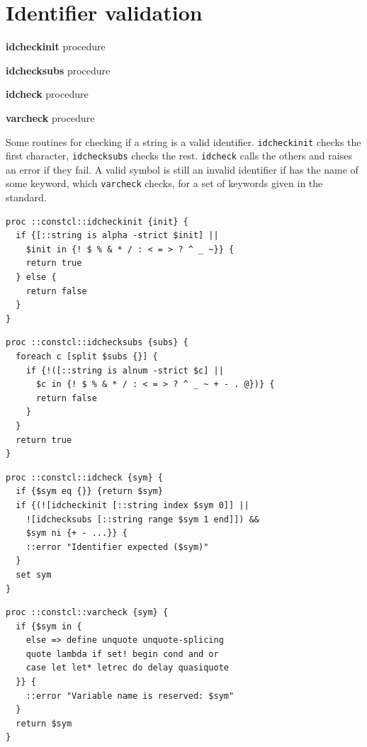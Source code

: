 \documentclass[a5paper,draft]{memoir}
\begin{document}
\chapter{Identifier validation}
\label{identifier-validation}

\textbf{idcheckinit} procedure

\noindent \textbf{idchecksubs} procedure

\noindent \textbf{idcheck} procedure

\noindent \textbf{varcheck} procedure

Some routines for checking if a string is a valid identifier. \texttt{idcheckinit} checks the first character, \texttt{idchecksubs} checks the rest. \texttt{idcheck} calls the others and raises an error if they fail. A valid symbol is still an invalid identifier if has the name of some keyword, which \texttt{varcheck} checks, for a set of keywords given in the standard.

\begin{lstlisting}
proc ::constcl::idcheckinit {init} {
  if {[::string is alpha -strict $init] ||
    $init in {! $ % & * / : < = > ? ^ _ ~}} {
    return true
  } else {
    return false
  }
}
\end{lstlisting}

\begin{lstlisting}
proc ::constcl::idchecksubs {subs} {
  foreach c [split $subs {}] {
    if {!([::string is alnum -strict $c] ||
      $c in {! $ % & * / : < = > ? ^ _ ~ + - . @})} {
      return false
    }
  }
  return true
}
\end{lstlisting}

\begin{lstlisting}
proc ::constcl::idcheck {sym} {
  if {$sym eq {}} {return $sym}
  if {(![idcheckinit [::string index $sym 0]] ||
    ![idchecksubs [::string range $sym 1 end]]) &&
    $sym ni {+ - ...}} {
    ::error "Identifier expected ($sym)"
  }
  set sym
}
\end{lstlisting}

\begin{lstlisting}
proc ::constcl::varcheck {sym} {
  if {$sym in {
    else => define unquote unquote-splicing
    quote lambda if set! begin cond and or
    case let let* letrec do delay quasiquote
  }} {
    ::error "Variable name is reserved: $sym"
  }
  return $sym
}
\end{lstlisting}
\end{document}

